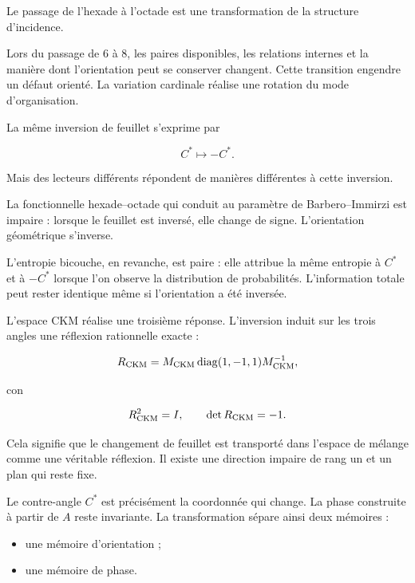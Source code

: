 Le passage de l’hexade à l’octade est une transformation de la structure d’incidence.\par

Lors du passage de \(6\) à \(8\), les paires disponibles, les relations internes et la manière dont l’orientation peut se conserver changent. Cette transition engendre un défaut orienté. La variation cardinale réalise une rotation du mode d’organisation.\par

La même inversion de feuillet s’exprime par\par

\[
C^*\longmapsto -C^*.
\]

Mais des lecteurs différents répondent de manières différentes à cette inversion.\par

La fonctionnelle hexade–octade qui conduit au paramètre de Barbero–Immirzi est impaire : lorsque le feuillet est inversé, elle change de signe. L’orientation géométrique s’inverse.\par

L’entropie bicouche, en revanche, est paire : elle attribue la même entropie à \(C^*\) et à \(-C^*\) lorsque l’on observe la distribution de probabilités. L’information totale peut rester identique même si l’orientation a été inversée.\par

L’espace CKM réalise une troisième réponse. L’inversion induit sur les trois angles une réflexion rationnelle exacte :\par

\[
R_{\rm CKM}
=
M_{\rm CKM}
\operatorname{diag}(1,-1,1)
M_{\rm CKM}^{-1},
\]

con\par

\[
R_{\rm CKM}^2=I,
\qquad
\det R_{\rm CKM}=-1.
\]

Cela signifie que le changement de feuillet est transporté dans l’espace de mélange comme une véritable réflexion. Il existe une direction impaire de rang un et un plan qui reste fixe.\par

Le contre-angle \(C^*\) est précisément la coordonnée qui change. La phase construite à partir de \(A\) reste invariante. La transformation sépare ainsi deux mémoires :\par

\begin{itemize}[leftmargin=*,itemsep=0.35em]
\item une mémoire d’orientation ;
\item une mémoire de phase.
\end{itemize}

